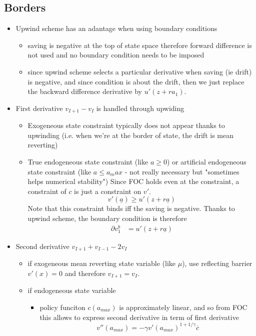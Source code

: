 \documentclass[english]{article}
\begin{document}
\subsection{Borders}
\begin{itemize}
	\item Upwind scheme has an adantage when using boundary conditions
	\begin{itemize}
		\item saving is negative at the top of state space therefore forward difference is not used and no boundary condition needs to be imposed
		\item since upwind scheme selects a particular derivative when saving (ie drift) is negative, and since condition is about the drift, then we just replace the backward difference derivative by $u'(z+ra_1)$.
	\end{itemize}
	\item First derivative $v_{I+1}-v_{I}$ is handled through upwiding
	\begin{itemize}
		\item Exogeneous state constraint typically does not appear thanks to upwinding (i.e. when we're at the border of state, the drift is mean reverting)
		\item True endogeneous state constraint (like $a \geq 0$) or artificial endogeneous state constraint (like $a \leq a_max$ - not really necessary but "sometimes helps numerical stability") 
		Since FOC holds even at the constraint,  a constraint of $c$ is just a constraint on $v'$.
		$$v'(\underline{a}) \geq u'(z+ r\underline{a})$$
		Note that this constraint binds iff the saving is negative. Thanks to upwind scheme, the boundary condition is therefore
		\begin{align*}
			\partial v^b_1&= u'(z+ r\underline{a})
		\end{align*}
	\end{itemize}
	\item Second derivative  $v_{I+1}+v_{I-1}-2v_{I}$
	\begin{itemize}
		\item if exogeneous mean reverting state variable (like $\mu$), use reflecting barrier $v'(x) = 0$ and therefore  $v_{I+1}=v_I$.
		\item if endogeneous state variable 
		\begin{itemize}
			\item policy funciton $c(a_{max})$ is approximately linear, and so from FOC this allows to express second derivative in term of first derivative 
			$$v''(a_{max}) = -\gamma v'(a_{max})^{1+1/\gamma} \overline{c}$$
		\end{itemize}
	\end{itemize}
\end{itemize}
\end{document}
